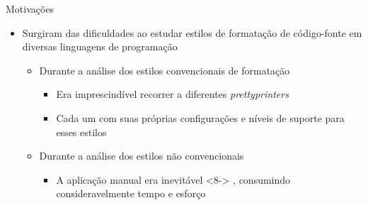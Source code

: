 \documentclass
  [ aspectratio=169,
    english,
    hyperref={citecolor=blue,colorlinks=true,linkcolor=blue,urlcolor=blue},
    brazil]
  {beamer}
\title{\witchcooking}
\subtitle{\witchcookingsubtitle}
\author{Átila Gama Silva}
\date{\today}
\begin{document}

  \begin{frame}\titlepage\end{frame}


  \begin{frame}{Motivações}
    \begin{itemize}
      \item<2-> Surgiram das dificuldades ao estudar estilos de formatação de
                código-fonte em diversas linguagens de programação
                \begin{itemize}
                  \item<3-> Durante a análise dos estilos convencionais de
                            formatação
                            \begin{itemize}
                              \item<4-> Era imprescindível recorrer a
                                        diferentes \textit{prettyprinters}
                              \item<5-> Cada um com suas próprias configurações
                                        e níveis de suporte para esses estilos
                            \end{itemize}
                  \item<6-> Durante a análise dos estilos não convencionais
                            \begin{itemize}
                              \item<7-> A aplicação manual era inevitável%
                                        \onslide
                                          <8->
                                          {%
                                            , consumindo consideravelmente tempo
                                            e esforço}
                            \end{itemize}
                \end{itemize}
    \end{itemize}
  \end{frame}

\end{document}
